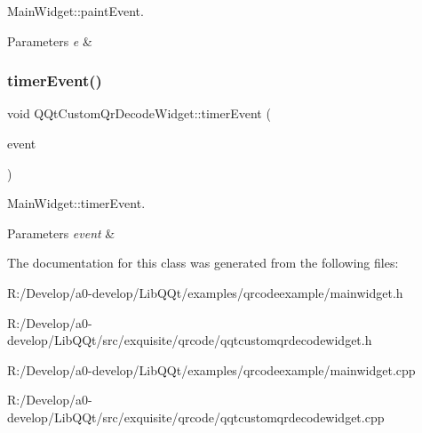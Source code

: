 Main\+Widget\+::paint\+Event. 


\begin{DoxyParams}{Parameters}
{\em e} & \\
\hline
\end{DoxyParams}
\mbox{\label{class_q_qt_custom_qr_decode_widget_a8190eb6ea34bc5c8ed15a83a0f16c5dc}} 
\subsubsection{\texorpdfstring{timer\+Event()}{timerEvent()}}
{\footnotesize\ttfamily void Q\+Qt\+Custom\+Qr\+Decode\+Widget\+::timer\+Event (\begin{DoxyParamCaption}\item[{Q\+Timer\+Event $\ast$}]{event }\end{DoxyParamCaption})\hspace{0.3cm}{\ttfamily [protected]}}



Main\+Widget\+::timer\+Event. 


\begin{DoxyParams}{Parameters}
{\em event} & \\
\hline
\end{DoxyParams}


The documentation for this class was generated from the following files\+:\begin{DoxyCompactItemize}
\item 
R\+:/\+Develop/a0-\/develop/\+Lib\+Q\+Qt/examples/qrcodeexample/mainwidget.\+h\item 
R\+:/\+Develop/a0-\/develop/\+Lib\+Q\+Qt/src/exquisite/qrcode/qqtcustomqrdecodewidget.\+h\item 
R\+:/\+Develop/a0-\/develop/\+Lib\+Q\+Qt/examples/qrcodeexample/mainwidget.\+cpp\item 
R\+:/\+Develop/a0-\/develop/\+Lib\+Q\+Qt/src/exquisite/qrcode/qqtcustomqrdecodewidget.\+cpp\end{DoxyCompactItemize}
